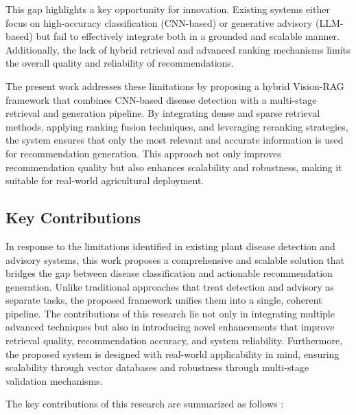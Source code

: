 This gap highlights a key opportunity for innovation. Existing systems
either focus on high-accuracy classification (CNN-based) or generative
advisory (LLM-based) but fail to effectively integrate both in a
grounded and scalable manner. Additionally, the lack of hybrid retrieval
and advanced ranking mechanisms limits the overall quality and
reliability of recommendations.

The present work addresses these limitations by proposing a hybrid
Vision-RAG framework that combines CNN-based disease detection with a
multi-stage retrieval and generation pipeline. By integrating dense and
sparse retrieval methods, applying ranking fusion techniques, and
leveraging reranking strategies, the system ensures that only the most
relevant and accurate information is used for recommendation generation.
This approach not only improves recommendation quality but also enhances
scalability and robustness, making it suitable for real-world
agricultural deployment.

\subsection{Key Contributions}\label{key-contributions}

In response to the limitations identified in existing plant disease
detection and advisory systems, this work proposes a comprehensive and
scalable solution that bridges the gap between disease classification
and actionable recommendation generation. Unlike traditional approaches
that treat detection and advisory as separate tasks, the proposed
framework unifies them into a single, coherent pipeline. The
contributions of this research lie not only in integrating multiple
advanced techniques but also in introducing novel enhancements that
improve retrieval quality, recommendation accuracy, and system
reliability. Furthermore, the proposed system is designed with
real-world applicability in mind, ensuring scalability through vector
databases and robustness through multi-stage validation mechanisms.

The key contributions of this research are summarized as follows :

